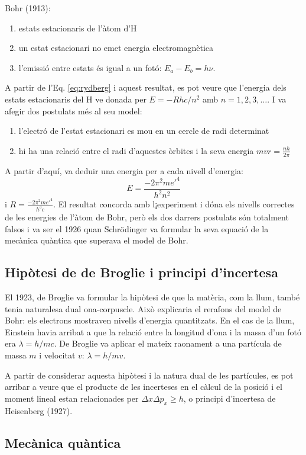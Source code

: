 Bohr (1913):
\begin{enumerate}
\item estats estacionaris de l'àtom d'H
\item un estat estacionari no emet energia electromagnètica
\item l'emissió entre estats és igual a un fotó: $E_a-E_b=h\nu$.
\end{enumerate}
A partir de l'Eq. \ref{eq:rydberg} i aquest resultat, es pot veure que l'energia dels estats estacionaris del H ve donada per $E=-Rhc/n^2$ amb $n=1,2,3,\dots$. I va afegir dos postulats més al seu model:
\begin{enumerate}
\item l'electró de l'estat estacionari es mou en un cercle de radi determinat
\item hi ha una relació entre el radi d'aquestes òrbites i la seva energia $mvr=\frac{nh}{2\pi}$
\end{enumerate}
A partir d'aquí, va deduir una energia per a cada nivell d'energia:
\[
E=\frac{-2\pi^2 m e'^4}{h^2n^2}
\]
i $R=\frac{-2\pi^2 m e'^4}{h^3c}$. El resultat concorda amb l¡experiment i dóna els nivells correctes de les energies de l'àtom de Bohr, però els dos darrers postulats són totalment falsos i va ser el 1926 quan Schrödinger va formular la seva equació de la mecànica quàntica que superava el model de Bohr.

\subsection{Hipòtesi de de Broglie i principi d'incertesa}
El 1923, de Broglie va formular la hipòtesi de que la matèria, com la llum, també tenia naturalesa dual ona-corpuscle. 
Això explicaria el rerafons del model de Bohr: els electrons mostraven nivells d'energia quantitzats.
En el cas de la llum, Einstein havia arribat a que la relació entre la longitud d'ona i la massa d'un fotó era $\lambda=h/mc$. De Broglie va aplicar el mateix raonament a una partícula de massa $m$ i velocitat $v$: $\lambda=h/mv$.

A partir de considerar aquesta hipòtesi i la natura dual de les partícules, es pot arribar a veure que el producte de les incerteses en el càlcul de la posició i el moment lineal estan relacionades per $\Delta x \Delta p_x \geq h$, o principi d'incertesa de Heisenberg (1927).

\subsection{Mecànica quàntica}

